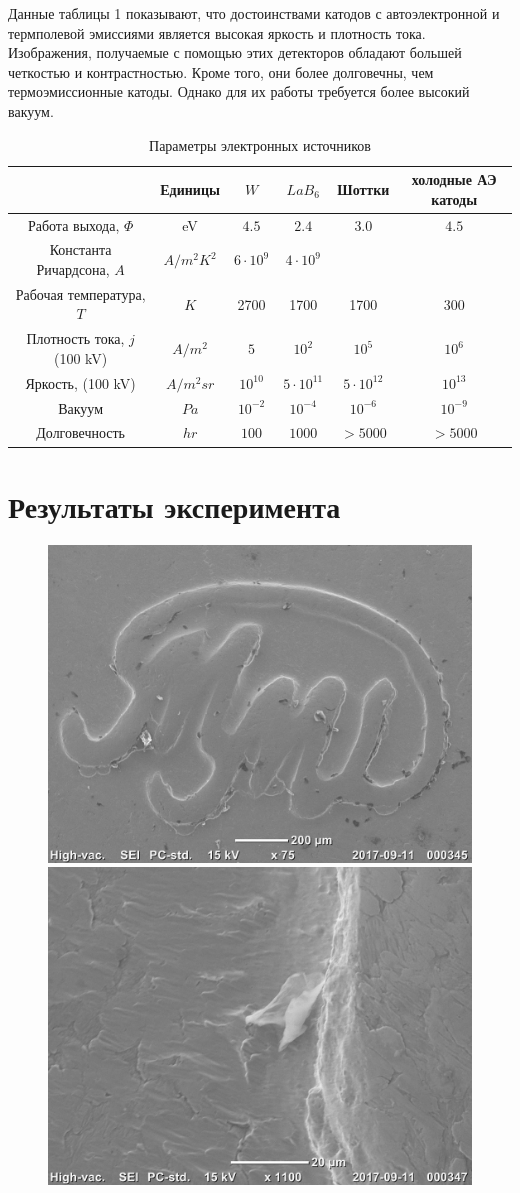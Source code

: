 \documentclass[12pt]{article}
\begin{document}
Данные таблицы 1 показывают, что достоинствами катодов с автоэлектронной и термполевой эмиссиями является высокая яркость и плотность тока. Изображения, получаемые с помощью этих детекторов обладают большей четкостью и контрастностью. Кроме того, они более долговечны, чем термоэмиссионные катоды. Однако для их работы требуется более высокий вакуум.

\begin{table}[!ht]
\centering
\label{table1}
\begin{tabular}{cccccc}
& Единицы & $W$ & $LaB_6$ & Шоттки & холодные АЭ катоды \\
\hline
Работа выхода, $\Phi$ & eV & $4.5$ & $2.4$ & $3.0$ & $4.5$ \\
Константа Ричардсона, $A$ & $A / m^2 K^2$ & $6 \cdot 10^{9}$ & $4 \cdot 10^{9}$ & & \\
Рабочая температура, $T$ & $K$ & 2700 & 1700 & 1700 & 300 \\
Плотность тока, $j$ (100 kV) & $A / m^2$ & $5$ & $10^{2}$ & $10^{5}$ & $10^{6}$ \\
Яркость, (100 kV) & $A/m^2 sr$ & $10^{10}$ & $5 \cdot 10^{11}$ & $5 \cdot 10^{12}$ & $10^{13}$ \\
Вакуум & $Pa$ & $10^{-2}$ & $10^{-4}$ & $10^{-6}$ & $10^{-9}$ \\
Долговечность & $hr$ & $100$ & $1000$ & $>5000$ & $>5000$ \\
\hline
\end{tabular}
\caption{Параметры электронных источников}
\end{table}

\clearpage
\section*{Результаты эксперимента}

\begin{figure}[!ht]
\includegraphics[width=0.5\linewidth]{pictures/20170911_000345.jpg}
\includegraphics[width=0.5\linewidth]{pictures/20170911_000347.jpg}
\end{figure}
\end{document}
